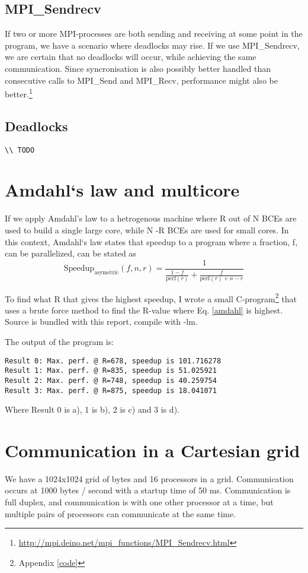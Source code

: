 \documentclass[english,a4paper,numbers=noenddot]{scrartcl}
\begin{document}
\subsection{MPI\_Sendrecv}
If two or more MPI-processes are both sending and receiving at some point in the program, we have a scenario where deadlocks may rise. If we use MPI\_Sendrecv, we are certain that no deadlocks will occur, while achieving the same communication. Since syncronisation is also possibly better handled than consecutive calls to MPI\_Send and MPI\_Recv, performance might also be better.\footnote{\url{http://mpi.deino.net/mpi_functions/MPI_Sendrecv.html}}

\subsection{Deadlocks}
\begin{lstlisting}
\\ TODO
\end{lstlisting}

\section{Amdahl`s law and multicore}
If we apply Amdahl's law to a hetrogenous machine where R out of N BCEs are used to build a single large core, while N -R BCEs are used for small cores. In this context, Amdahl`s law states that speedup to a program where a fraction, f, can be parallelized, can be stated as
\begin{equation}
    \label{amdahl}
    \text{Speedup}_{\text{asymetric}} (f,n,r)= \frac{1}{\frac{1-f}{\text{perf}(r)} + \frac{f}{\text{perf}(r) + n - r}}
\end{equation}

To find what R that gives the highest speedup, I wrote a small C-program\footnote{Appendix \ref{code}} that uses a brute force method to find the R-value where Eq. \eqref{amdahl} is highest. Source is bundled with this report, compile with -lm.

The output of the program is:
\begin{lstlisting}
Result 0: Max. perf. @ R=678, speedup is 101.716278
Result 1: Max. perf. @ R=835, speedup is 51.025921
Result 2: Max. perf. @ R=748, speedup is 40.259754
Result 3: Max. perf. @ R=875, speedup is 18.041071
\end{lstlisting}
Where Result 0 is a), 1 is b), 2 is c) and 3 is d).

\newpage
\section{Communication in a Cartesian grid}
We have a 1024x1024 grid of bytes and 16 processors in a grid. Communication occurs at 1000 bytes / second with a startup time of 50 ms. Communication is full duplex, and communication is with one other processor at a time, but multiple pairs of processors can communicate at the same time.
\end{document}
